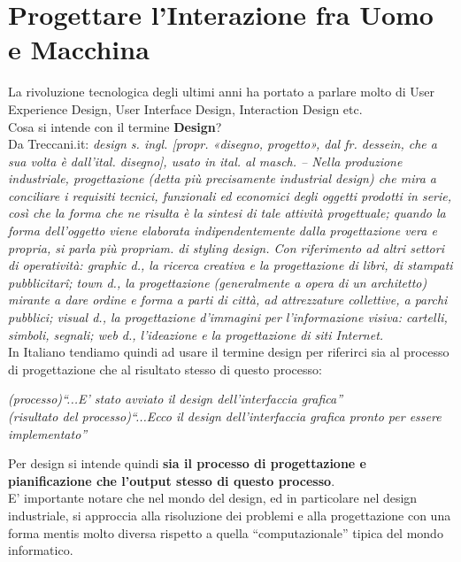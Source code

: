 \chapter{Progettare l'Interazione fra Uomo e Macchina}

La rivoluzione tecnologica degli ultimi anni ha portato a parlare molto di User Experience Design, User Interface Design, Interaction Design etc.\\ 

Cosa si intende con il termine \textbf{Design}?\\

Da Treccani.it: \textit{design s. ingl. [propr. «disegno, progetto», dal fr. dessein, che a sua volta è dall’ital. disegno], usato in ital. al masch. – Nella produzione industriale, progettazione (detta più precisamente industrial design) che mira a conciliare i requisiti tecnici, funzionali ed economici degli oggetti prodotti in serie, così che la forma che ne risulta è la sintesi di tale attività progettuale; quando la forma dell’oggetto viene elaborata indipendentemente dalla progettazione vera e propria, si parla più propriam. di styling design. Con riferimento ad altri settori di operatività: graphic d., la ricerca creativa e la progettazione di libri, di stampati pubblicitarî; town d., la progettazione (generalmente a opera di un architetto) mirante a dare ordine e forma a parti di città, ad attrezzature collettive, a parchi pubblici; visual d., la progettazione d’immagini per l’informazione visiva: cartelli, simboli, segnali; web d., l’ideazione e la progettazione di siti Internet.}\\

In Italiano tendiamo quindi ad usare il termine design per riferirci sia al processo di progettazione che al risultato stesso di questo processo:

\begin{flushleft}
    \textit{(processo)``...E' stato avviato il design dell'interfaccia grafica''}\\
    \textit{(risultato del processo)``...Ecco il design dell'interfaccia grafica pronto per essere implementato''}\\
\end{flushleft}


 Per design si intende quindi \textbf{sia il processo di progettazione e pianificazione che l'output stesso di questo processo}. \\
 
 E' importante notare che nel mondo del design, ed in particolare nel design industriale, si approccia alla risoluzione dei problemi e alla progettazione con una forma mentis molto diversa rispetto a quella ``computazionale'' tipica del mondo informatico.
 
